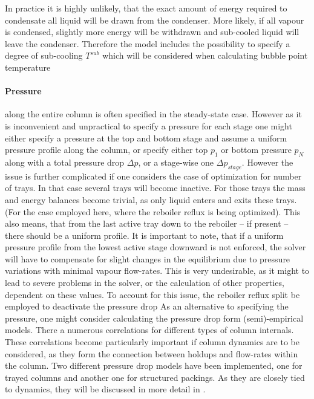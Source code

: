         In practice it is highly unlikely, that the exact amount of energy required to condensate all
        liquid will be drawn from the condenser. More likely, if all vapour is condensed, slightly more
        energy will be withdrawn and sub-cooled liquid will leave the condenser. Therefore
        the model includes the possibility to specify a degree of sub-cooling $T^{sub}$ which will be
        considered when calculating bubble point temperature
        \paragraph{Pressure} along the entire column is often specified in the steady-state case.
        However as it is inconvenient and unpractical to specify a pressure for each stage one might either specify
        a pressure at the top and bottom stage and assume a uniform pressure profile along the column, or
        specify either top $p_1$ or bottom pressure $p_N$ along with a total pressure drop $\Delta p$,
        or a stage-wise one $\Delta p_{stage}$. However the issue is further complicated if one considers the
        case of optimization for number of trays. In that case several trays will become inactive. For those
        trays the mass and energy balances become trivial, as only liquid enters and exits these trays.
        (For the case employed here, where the reboiler reflux is being optimized). This also means,
        that from the last active tray down to the reboiler -- if present -- there should be a uniform
        profile. It is important to note, that if a uniform pressure profile from the lowest active stage
        downward is not enforced, the solver will have to compensate for slight changes in the equilibrium
        due to pressure variations with minimal vapour flow-rates. This is very undesirable, as it might to
        lead to severe problems in the solver, or the calculation of other properties, dependent on these values.
        To account for this issue, the reboiler reflux split be employed to deactivate the pressure drop
        As an alternative to specifying the pressure, one might consider calculating the pressure drop
        form (semi)-empirical models. There a numerous correlations for different types of column internals.
        These correlations become particularly important if column dynamics are to be considered, as they
        form the connection between holdups and flow-rates within the column. Two different pressure drop models
        have been implemented, one for trayed columns and another one for structured packings. As they are closely
        tied to dynamics, they will be discussed in more detail in .

